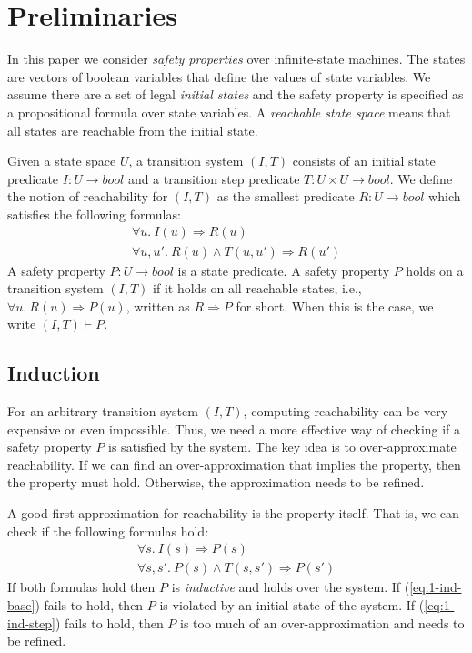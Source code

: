 \section{Preliminaries}
\label{sec:prelim}
\newcommand{\bool}[0]{\mathit{bool}}
\newcommand{\reach}[0]{\mathit{R}}
\newcommand{\ite}[3]{\mathit{if}\ {#1}\ \mathit{then}\ {#2}\ \mathit{else}\ {#3}}

In this paper we consider \emph{safety properties} over infinite-state machines. The states are vectors of boolean variables that define the values of state variables. We assume there are a set of legal \emph{initial states} and the safety property is specified as a propositional formula over state variables. A \emph{reachable state space} means that all states are reachable from the initial state. 

Given a state space $U$, a transition system $(I,T)$ consists of an
initial state predicate $I : U \to \bool$ and a transition step
predicate $T : U \times U \to \bool$.
We define the notion of
reachability for $(I, T)$ as the smallest predicate $\reach : U \to
\bool$ which satisfies the following formulas:
\begin{gather*}
  \forall u.~ I(u) \Rightarrow \reach(u) \\
  \forall u, u'.~ \reach(u) \land T(u, u') \Rightarrow \reach(u')
\end{gather*}
A safety property $P : U \to \bool$ is a state predicate. A safety
property $P$ holds on a transition system $(I, T)$ if it holds on all
reachable states, i.e., $\forall u.~ \reach(u) \Rightarrow P(u)$,
written as $\reach \Rightarrow P$ for short. When this is the case, we
write $(I, T)\vdash P$.

\subsection{Induction}
For an arbitrary transition system $(I, T)$, computing reachability
can be very expensive or even impossible. Thus, we need a more
effective way of checking if a safety property $P$ is satisfied by the
system. The key idea is to over-approximate reachability. If we can
find an over-approximation that implies the property, then the
property must hold. Otherwise, the approximation needs to be refined.

A good first approximation for reachability is the property itself.
That is, we can check if the following formulas hold:
\begin{gather}
  \forall s.~ I(s) \Rightarrow P(s)
  \label{eq:1-ind-base} \\
  \forall s, s'.~ P(s) \land T(s, s') \Rightarrow P(s')
  \label{eq:1-ind-step}
\end{gather}
If both formulas hold then $P$ is {\em inductive} and holds over the
system. If (\ref{eq:1-ind-base}) fails to hold, then $P$ is violated
by an initial state of the system. If (\ref{eq:1-ind-step}) fails to
hold, then $P$ is too much of an over-approximation and needs to be
refined.

